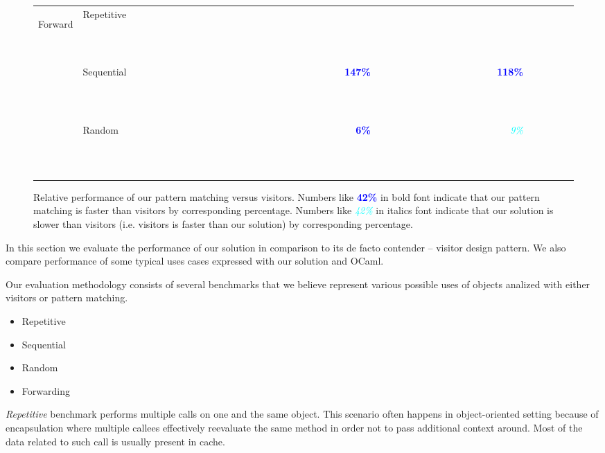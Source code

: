 \documentclass[preprint]{sigplanconf}
\newcommand{\f}[1]{{ {\bf \textcolor{blue}{#1\%}}}}
\newcommand{\s}[1]{{ {\em \textcolor{cyan}{#1\%}}}}
\newcommand{\n}[1]{{ {\bf ~ ~ ~ ~ }}}
\begin{document}
\begin{figure}
\begin{tabular}{@{}c@{ }l||@{ }r@{}@{ }r@{}@{ }r@{}|@{ }r@{}@{ }r@{}@{ }r@{}||@{ }r@{}@{ }r@{}@{ }r@{}|@{ }r@{}@{ }r@{}@{ }r@{}||@{ }r@{}@{ }r@{}@{ }r@{}|@{ }r@{}@{ }r@{}@{ }r@{}}
\hline %
\multirow{3}{*}{\begin{sideways}{\scriptsize Forward}\end{sideways}}
 & Repetitive &\n{   }&\n{   }&\n{   }&\n{   }&\n{   }&\n{   }&\n{   }&\n{   }&\n{   }&\n{   }&\n{   }&\n{   }&\n{   }&\n{   }&\n{   }&\n{   }&\n{   }&\n{   } \\
 & Sequential &\n{   }&\n{   }&\n{   }&\n{   }&\n{   }&\n{   }&\n{   }&\n{   }&\n{   }&\f{147}&\n{   }&\n{   }&\n{   }&\n{   }&\n{   }&\f{118}&\n{   }&\n{   } \\
 & Random     &\n{   }&\n{   }&\n{   }&\n{   }&\n{   }&\n{   }&\n{   }&\n{   }&\n{   }&\f{  6}&\n{   }&\n{   }&\n{   }&\n{   }&\n{   }&\s{  9}&\n{   }&\n{   } \\
\hline %
\end{tabular}
\caption{Relative performance of our pattern matching versus visitors. Numbers 
like \f{42} in bold font indicate that our pattern matching is faster than 
visitors by corresponding percentage. Numbers like \s{42} in italics font 
indicate that our solution is slower than visitors (i.e. visitors is faster than 
our solution) by corresponding percentage.}
\label{relperf}
\end{figure}

In this section we evaluate the performance of our solution in comparison to its 
de facto contender -- visitor design pattern. We also compare performance of 
some typical uses cases expressed with our solution and OCaml.

Our evaluation methodology consists of several benchmarks that we believe 
represent various possible uses of objects analized with either visitors or 
pattern matching.

\begin{itemize}
\item Repetitive
\item Sequential
\item Random
\item Forwarding
\end{itemize}

\emph{Repetitive} benchmark performs multiple calls on one and the same object. 
This scenario often happens in object-oriented setting because of encapsulation 
where multiple callees effectively reevaluate the same method in order not to 
pass additional context around. Most of the data related to such call is usually 
present in cache.
\end{document}
